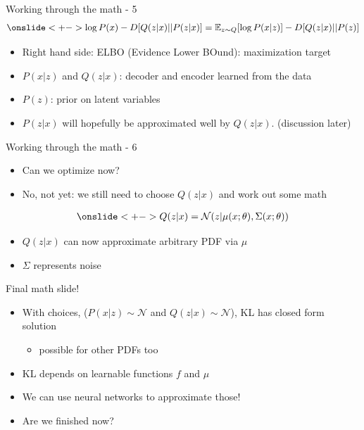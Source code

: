 \documentclass[10pt,aspectratio=169,handout]{beamer}
\begin{document}
\begin{frame}{Working through the math - 5}
    \begin{align*}
        \onslide<+->{\log P(x) - D[Q(z|x)||P(z|x)] = \mathbb{E}_{z\sim Q}[\log P(x|z)] - D[Q(z|x)||P(z)]}
    \end{align*}
    
    \begin{itemize}[<+->]
        \item Right hand side: ELBO (Evidence Lower BOund): maximization target
        \item $P(x|z)$ and $Q(z|x)$: decoder and encoder learned from the data
        \item $P(z)$: prior on latent variables
        \item $P(z|x)$ will hopefully be approximated well by $Q(z|x)$. (discussion later)
    \end{itemize}
\end{frame}
\begin{frame}{Working through the math - 6}
    \begin{itemize}[<+->]
        \item Can we optimize now?
        \item No, not yet: we still need to choose $Q(z|x)$ and work out some math
    \end{itemize}
    \begin{align*}
        \onslide<+->{Q(z|x) = \mathcal{N}(z|\mu(x;\theta),\Sigma(x;\theta))}
    \end{align*}

    \begin{itemize}[<+->]
        \item $Q(z|x)$ can now approximate arbitrary PDF via $\mu$
        \item $\Sigma$ represents noise
    \end{itemize}
\end{frame}

\begin{frame}{Final math slide!}
    \begin{itemize}[<+->]
        \item With choices, ($P(x|z)\sim\mathcal{N}$ and $Q(z|x)\sim\mathcal{N}$), KL has closed form solution
            \begin{itemize}
                \item possible for other PDFs too
            \end{itemize}
        \item KL depends on learnable functions $f$ and $\mu$
        \item We can use neural networks to approximate those!
        \item Are we finished now?
    \end{itemize}
\end{frame}
\end{document}
